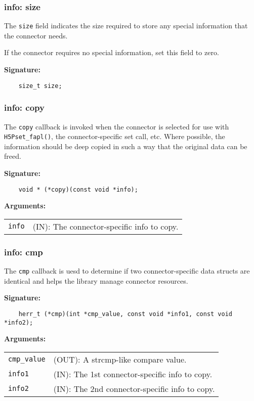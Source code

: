 \subsubsection{info: size}
The \texttt{size} field indicates the size required to store any special information that the connector needs.

If the connector requires no special information, set this field to zero.

\begin{mdframed}[style=bgbox]
\textbf{Signature:}
\begin{lstlisting}
    size_t size;
\end{lstlisting}
\end{mdframed}

\subsubsection{info: copy}
The \texttt{copy} callback is invoked when the connector is selected for use with \texttt{H5Pset\_fapl()}, the connector-specific set call, etc. Where possible, the information should be deep copied in such a way that the original data can be freed.

\begin{mdframed}[style=bgbox]
\textbf{Signature:}
\begin{lstlisting}
    void * (*copy)(const void *info);
\end{lstlisting}
\textbf{Arguments:}\\
\begin{tabular}{l p{13.5cm}}
  \texttt{info} & (IN): The connector-specific info to copy.\\
\end{tabular}
\end{mdframed}

\subsubsection{info: cmp}
The \texttt{cmp} callback is uesd to determine if two connector-specific data structs are identical and helps the library manage connector resources.

\begin{mdframed}[style=bgbox]
\textbf{Signature:}
\begin{lstlisting}
    herr_t (*cmp)(int *cmp_value, const void *info1, const void *info2);
\end{lstlisting}
\textbf{Arguments:}\\
\begin{tabular}{l p{13.5cm}}
  \texttt{cmp\_value} & (OUT): A strcmp-like compare value.\\
  \texttt{info1} & (IN): The 1st connector-specific info to copy.\\
  \texttt{info2} & (IN): The 2nd connector-specific info to copy.\\
\end{tabular}
\end{mdframed}

